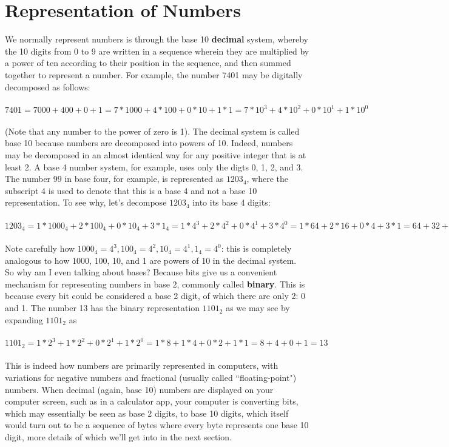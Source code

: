 \documentclass{article}
\begin{document}
\section*{Representation of Numbers}
We normally represent numbers is through the base 10 \textbf{decimal} system, whereby the 10 digits from 0 to 9 
are written in a sequence wherein they are multiplied by a power of ten according to their position in the sequence,
and then summed together to represent a number. For example, the number 7401 may be digitally decomposed as follows: \\ \\
$7401 = 7000 + 400 + 0 + 1 = 7 * 1000 + 4 * 100 + 0 * 10 + 1 * 1 = 7 * 10^3 + 4 * 10^2 + 0 * 10^1 + 1 * 10^0$ \\ \\
(Note that any number to the power of zero is 1).
The decimal system is called base 10 because numbers are decomposed into powers of 10. Indeed, numbers may be decomposed
in an almost identical way for any positive integer that is at least 2. A base 4 number system, for example, uses only
the digts 0, 1, 2, and 3. The number 99 in base four, for example, is represented as $1203_4$, where the subscript
4 is used to denote that this is a base 4 and not a base 10 representation. To see why, let's decompose $1203_4$ into its
base 4 digits: \\ \\
$1203_4 = 1 * 1000_4 + 2 * 100_4 + 0 * 10_4 + 3 * 1_4 = 1 * 4^3 + 2 * 4^2 + 0 * 4^1 + 3 * 4^0 = 
1 * 64 + 2 * 16 + 0 * 4 + 3 * 1 = 64 + 32 + 0 + 3 = 99$ \\ \\
Note carefully how $1000_4 = 4^3, 100_4 = 4^2, 10_4 = 4^1, 1_4 = 4^0$: this is completely analogous to how 
1000, 100, 10, and 1 are powers of 10 in the decimal system. \\

So why am I even talking about bases? Because bits give us a convenient mechanism for representing numbers in base 2,
commonly called \textbf{binary}. This is because every bit could be considered a base 2 digit, of which there are only
2: 0 and 1. The number 13 has the binary representation $1101_2$ as we may see by expanding $1101_2$ as \\ \\
$1101_2 = 1 * 2^3 + 1 * 2^2 + 0 * 2^1 + 1 * 2^0 = 1 * 8 + 1 * 4 + 0 * 2 + 1 * 1 = 8 + 4 + 0 + 1 = 13$ \\ \\
This is indeed how numbers are primarily represented in computers, with variations for negative numbers and fractional
(usually called ``floating-point") numbers. When decimal (again, base 10) numbers are displayed on your computer screen,
such as in a calculator app, your computer is converting bits, which may essentially be seen as base 2
digits, to base 10 digits, which itself would turn out to be a sequence of bytes where every byte represents one base
10 digit, more details of which we'll get into in the next section.
\end{document}
